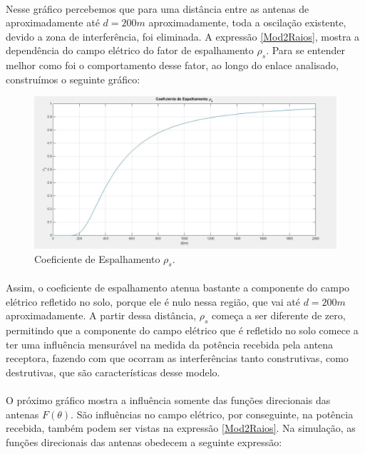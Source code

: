 \paragraph{}Nesse gráfico percebemos que para uma distância entre as antenas de aproximadamente até $d = 200m$ aproximadamente, toda a oscilação existente, devido a zona de interferência, foi eliminada. A expressão \ref{Mod2Raios}, mostra a dependência do campo elétrico do fator de espalhamento $\rho_s$. Para se entender melhor como foi o comportamento desse fator, ao longo do enlace analisado, construímos o seguinte gráfico:

\FloatBarrier
\begin{figure}[!htp]
\centering
\includegraphics[scale = 0.3]{Figuras/Coef_Espalha_2.JPG}
\caption{Coeficiente de Espalhamento $\rho_s$.}
\end{figure}
\FloatBarrier

\paragraph{}Assim, o coeficiente de espalhamento atenua bastante a componente do campo elétrico refletido no solo, porque ele é nulo nessa região, que vai até $d = 200m$ aproximadamente. A partir dessa distância, $\rho_s$ começa a ser diferente de zero, permitindo que a componente do campo elétrico que é refletido no solo comece a ter uma influência mensurável na medida da potência recebida pela antena receptora, fazendo com que ocorram as interferências tanto construtivas, como destrutivas, que são características desse modelo.

\paragraph{}O próximo gráfico mostra a influência somente das funções direcionais das antenas $F(\theta)$. São influências no campo elétrico, por conseguinte, na potência recebida, também podem ser vistas na expressão \ref{Mod2Raios}. Na simulação, as funções direcionais das antenas obedecem a seguinte expressão:


